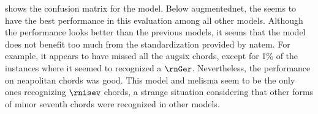 
 shows the confusion
matrix for the \textcite{mcleod2021modular} model. Below
\gls{augmentednet}, the \textcite{mcleod2021modular} seems
to have the best performance in this evaluation among all
other models. Although the performance looks better than the
previous models, it seems that the model does not benefit
too much from the standardization provided by \gls{natem}.
For example, it appears to have missed all the \gls{augsix}
chords, except for 1\% of the instances where it seemed to
recognized a $\rnGer$. Nevertheless, the performance on
\gls{neapolitan} chords was good. This model and
\gls{melisma} seem to be the only ones recognizing $\rnisev$
chords, a strange situation considering that other forms of
minor seventh chords were recognized in other models.

